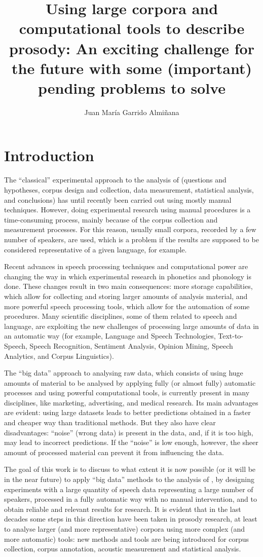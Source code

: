 \documentclass[output=paper]{langsci/langscibook}
\author{Juan María Garrido Almiñana\affiliation{National Distance Education University}}
\title{Using large corpora and computational tools to describe prosody: An exciting challenge for the future with some (important) pending problems to solve}
\begin{document}
\label{chap:gar2}\label{ch:1}

\section{Introduction}
The ``classical'' experimental approach to the analysis of  (questions and hypotheses, corpus design and collection, data measurement, statistical analysis, and conclusions) has until recently been carried out using mostly manual techniques. However, doing experimental research using manual procedures is a time-consuming process, mainly because of the corpus collection and measurement processes. For this reason, usually small corpora, recorded by a few number of speakers, are used, which is a problem if the results are supposed to be considered representative of a given language, for example.

Recent advances in speech processing techniques and computational power are changing the way in which experimental research in phonetics and phonology is done. These changes result in two main consequences: more storage capabilities, which allow for collecting and storing larger amounts of analysis material, and more powerful speech processing tools, which allow for the automation of some procedures. Many scientific disciplines, some of them related to speech and language, are exploiting the new challenges of processing large amounts of data in an automatic way (for example, Language and Speech Technologies, Text-to-Speech, Speech Recognition, Sentiment Analysis, Opinion Mining, Speech Analytics, and Corpus Linguistics). 

The ``big data'' approach to analysing raw data, which consists of using huge amounts of material to be analysed by applying fully (or almost fully) automatic processes and using powerful computational tools, is currently present in many disciplines, like marketing, advertising, and medical research. Its main advantages are evident: using large datasets leads to better predictions obtained in a faster and cheaper way than traditional methods. But they also have clear disadvantages: ``noise'' (wrong data) is present in the data, and, if it is too high, may lead to incorrect predictions. If the ``noise'' is low enough, however, the sheer amount of processed material can prevent it from influencing the data.

The goal of this work is to discuss to what extent it is now possible (or it will be in the near future) to apply ``big data'' methods to the analysis of , by designing experiments with a large quantity of speech data representing a large number of speakers, processed in a fully automatic way with no manual intervention, and to obtain reliable and relevant results for  research. It is evident that in the last decades some steps in this direction have been taken in prosody research, at least to analyse larger (and more representative) corpora using more complex (and more automatic) tools: new methods and tools are being introduced for corpus collection, corpus annotation, acoustic measurement and statistical analysis. 
\end{document}
